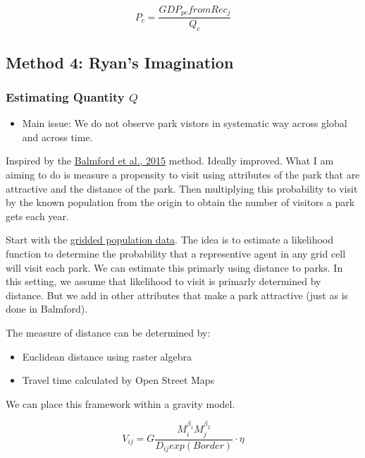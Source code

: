 \documentclass[
  letterpaper,
  DIV=11,
  numbers=noendperiod]{scrartcl}
\providecommand{\tightlist}{%
  \setlength{\itemsep}{0pt}\setlength{\parskip}{0pt}}\usepackage{longtable,booktabs,array}
\begin{document}
\[
P_c = \frac{GDP_{pc} from Rec_j}{Q_c}
\]

\hypertarget{method-4-ryans-imagination}{%
\subsection{Method 4: Ryan's
Imagination}\label{method-4-ryans-imagination}}

\hypertarget{estimating-quantity-q}{%
\subsubsection{\texorpdfstring{Estimating Quantity
\(Q\)}{Estimating Quantity Q}}\label{estimating-quantity-q}}

\begin{itemize}
\tightlist
\item
  Main issue: We do not observe park vistors in systematic way across
  global and across time.
\end{itemize}

Inspired by the
\href{https://journals.plos.org/plosbiology/article?id=10.1371/journal.pbio.1002074}{Balmford
et al., 2015} method. Ideally improved. What I am aiming to do is
measure a propensity to visit using attributes of the park that are
attractive and the distance of the park. Then multiplying this
probability to visit by the known population from the origin to obtain
the number of visitors a park gets each year.

Start with the
\href{https://sedac.ciesin.columbia.edu/data/collection/gpw-v4}{gridded
population data}. The idea is to estimate a likelihood function to
determine the probability that a representive agent in any grid cell
will visit each park. We can estimate this primarly using distance to
parks. In this setting, we assume that likelihood to visit is primarly
determined by distance. But we add in other attributes that make a park
attractive (just as is done in Balmford).

The measure of distance can be determined by:

\begin{itemize}
\tightlist
\item
  Euclidean distance using raster algebra
\item
  Travel time calculated by Open Street Maps
\end{itemize}

We can place this framework within a gravity model.

\[
V_{ij} = G \frac{M_i^{\beta_1}M_j^{\beta_2}}{D_{ij}exp(Border)} \cdot \eta
\]
\end{document}
